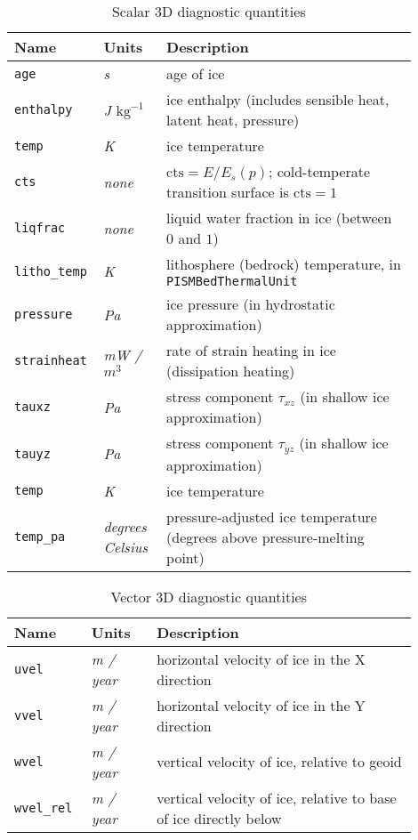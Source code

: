\begin{table}[ht]
  \centering
  \begin{tabular}{p{0.15\linewidth}p{0.15\linewidth}p{0.6\linewidth}}
    \toprule
    \textbf{Name} & \textbf{Units} & \textbf{Description} \\
    \midrule
    \texttt{age} & \textsl{s} & age of ice \\
    \texttt{enthalpy} & \textsl{J $\mathrm{kg}^{-1}$} & ice enthalpy (includes sensible heat, latent heat, pressure) \\
    \texttt{temp} & \textsl{K} & ice temperature \\
    \texttt{cts} & \textsl{none} &  $\mathrm{cts} = E/E_s(p)$; cold-temperate transition surface is $\mathrm{cts} = 1$ \\
    \texttt{liqfrac} & \textsl{none} &  liquid water fraction in ice (between $0$ and $1$) \\
    \texttt{litho_temp} & \textsl{K} & lithosphere (bedrock) temperature, in \texttt{PISMBedThermalUnit} \\
    \texttt{pressure} & \textsl{Pa} &  ice pressure (in hydrostatic approximation) \\
    \texttt{strainheat} & \textsl{mW / $m^3$} & rate of strain heating in ice (dissipation heating) \\
    \texttt{tauxz} & \textsl{Pa} &  stress component $\tau_{xz}$ (in shallow ice approximation) \\
    \texttt{tauyz} & \textsl{Pa} &  stress component $\tau_{yz}$ (in shallow ice approximation) \\
    \texttt{temp} & \textsl{K} &  ice temperature \\
    \texttt{temp_pa} & \textsl{degrees Celsius} &  pressure-adjusted ice temperature (degrees above pressure-melting point) \\
    \bottomrule
  \end{tabular}
\caption{Scalar 3D diagnostic quantities}
\label{tab:three-d-diagnostics}
\end{table}

\begin{table}[ht]
  \centering
  \begin{tabular}{p{0.15\linewidth}p{0.15\linewidth}p{0.6\linewidth}}
    \toprule
    \textbf{Name} & \textbf{Units} & \textbf{Description} \\
    \midrule
    \texttt{uvel} & \textsl{m / year} &  horizontal velocity of ice in the X direction \\
    \texttt{vvel} & \textsl{m / year} &  horizontal velocity of ice in the Y direction \\
    \texttt{wvel} & \textsl{m / year} &  vertical velocity of ice, relative to geoid \\
    \texttt{wvel_rel} & \textsl{m / year} &  vertical velocity of ice, relative to base of ice directly below \\
    \bottomrule
  \end{tabular}
\caption{Vector 3D diagnostic quantities}
\label{tab:three-d-diagnostics-vector}
\end{table}

